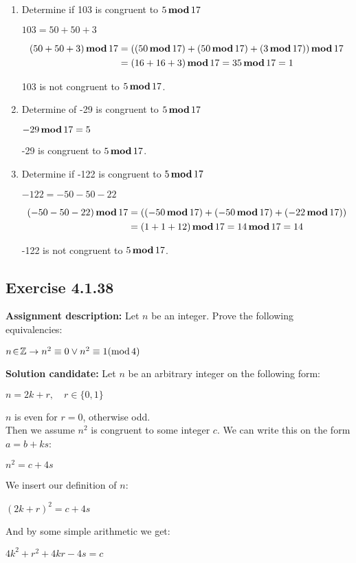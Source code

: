 \documentclass{report}
\newcommand{\cent}[1]{\begin{center}#1\end{center}}
\newcommand{\mAlign}[1]{\begin{align*}#1\end{align*}}
\newcommand{\doubleZ}{\mathbb{Z}}
\newcommand{\In}{\! \in \!}
\newcommand{\assignmentDescription}{\textbf{Assignment description: }}
\newcommand{\solution}{\textbf{Solution candidate: }}
\newcommand{\Exercise}[1]{\subsection{Exercise #1}}
\newcommand{\defaultEnumerateLabel}{\textbf{\alph*.}}
\newcommand{\modInline}{\text{mod\,}}
\newcommand{\modFunc}{\text{\,\textbf{mod}\,}}
\newcommand{\myItem}[1]{\item #1\\}
\begin{document}
\begin{enumerate}[label=\defaultEnumerateLabel]
\begin{enumerate} [label=\defaultEnumerateLabel]
		80 is not congruent to $5 \modFunc 17$.\\
		
		\myItem{Determine if 103 is congruent to $5 \modFunc 17$}
		
		\cent{$103 = 50 + 50 + 3$}
		\tiny
		\mAlign{(50+50+3) \modFunc 17 &= ((50 \modFunc 17) + (50 \modFunc 17) + (3 \modFunc 17)) \modFunc 17\\
						&= (16+16+3) \modFunc 17 = 35 \modFunc 17 = 1}
		\normalsize
		
		103 is not congruent to $5 \modFunc 17$.\\
		
		\myItem{Determine of -29 is congruent to $5 \modFunc 17$}
		
		\cent{$-29 \modFunc 17 = 5$}
		
		-29 is congruent to $5 \modFunc 17$.\\
		
		\myItem{Determine if -122 is congruent to $5 \modFunc 17$}
		
		\cent{$-122 = - 50 - 50 - 22$}
		
		\tiny
		\mAlign{(- 50 - 50 - 22) \modFunc 17 &= ((-50 \modFunc 17) +(-50 \modFunc 17) + (-22 \modFunc 17) )  \\
					&= (1+1+12) \modFunc 17 = 14 \modFunc 17 = 14 }
		\normalsize
		
		-122 is not congruent to $5 \modFunc 17$.\\
	\end{enumerate}
	
	\Exercise{4.1.38}
	\assignmentDescription
	Let $n$ be an integer. Prove the following equivalencies:
	
	\cent{$n \In \doubleZ \to n^2 \equiv 0 \vee n^2 \equiv 1 (\modInline 4)$}
	
	\solution
	Let $n$ be an arbitrary integer on the following form:
	
	\cent{$n = 2k + r, \quad r \in \{0,1\}$}
	
	$n$ is even for $r= 0$, otherwise odd.\\
	
	Then we assume $n^2$ is congruent to some integer $c$. We can write this on the form $a=b+ks$:
	
	\cent{$n^2 = c + 4s$}
	
	We insert our definition of $n$:
	
	\cent{$(2k+r)^2 = c + 4s$}
	
	And by some simple arithmetic we get:
	
	\cent{$4k^2 + r^2 + 4kr - 4s = c$}
	

\end{enumerate}
\end{document}
